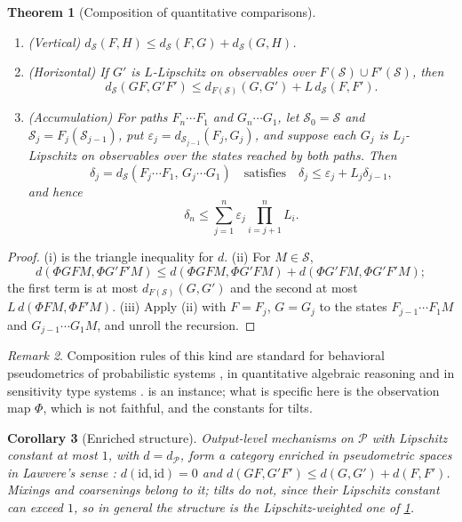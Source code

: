 \documentclass[11pt]{article}
\newtheorem{theorem}{Theorem}[section]
\newtheorem{corollary}[theorem]{Corollary}
\theoremstyle{definition}
\theoremstyle{remark}
\newtheorem{remark}[theorem]{Remark}
\newcommand{\cP}{\mathcal{P}}
\newcommand{\cS}{\mathcal{S}}
\begin{document}
\begin{theorem}[Composition of quantitative comparisons]\label{thm:composition}
\leavevmode
\begin{enumerate}[label=(\roman*)]
\item (Vertical) $d_\cS(F,H)\le d_\cS(F,G)+d_\cS(G,H)$.
\item (Horizontal) If $G'$ is $L$-Lipschitz on observables over $F(\cS)\cup F'(\cS)$, then
  \[
  d_\cS(GF,G'F')\le d_{F(\cS)}(G,G')+L\,d_\cS(F,F').
  \]
\item (Accumulation) For paths $F_n\cdots F_1$ and $G_n\cdots G_1$, let $\cS_0=\cS$ and
  $\cS_j=F_j(\cS_{j-1})$, put $\varepsilon_j=d_{\cS_{j-1}}(F_j,G_j)$, and suppose each $G_j$ is
  $L_j$-Lipschitz on observables over the states reached by both paths. Then
  \[
  \delta_j=d_\cS(F_j\cdots F_1,\,G_j\cdots G_1)\quad\text{satisfies}\quad
  \delta_j\le\varepsilon_j+L_j\delta_{j-1},
  \]
  and hence
  \[
  \delta_n\le\sum_{j=1}^n\varepsilon_j\prod_{i=j+1}^nL_i .
  \]
\end{enumerate}
\end{theorem}
\begin{proof}
(i) is the triangle inequality for $d$. (ii) For $M\in\cS$,
\[
d(\Phi GFM,\Phi G'F'M)\le d(\Phi GFM,\Phi G'FM)+d(\Phi G'FM,\Phi G'F'M);
\]
the first term is at most $d_{F(\cS)}(G,G')$ and the second at most $L\,d(\Phi FM,\Phi F'M)$. (iii) Apply (ii) with $F=F_j$, $G=G_j$ to the states $F_{j-1}\cdots F_1M$
and $G_{j-1}\cdots G_1M$, and unroll the recursion.
\end{proof}

\begin{remark}
Composition rules of this kind are standard for behavioral pseudometrics of probabilistic systems
\cite{Desharnais2004}, in quantitative algebraic reasoning \cite{MPP2016} and in sensitivity type
systems \cite{ReedPierce2010}.  is an instance; what is specific here is the
observation map $\Phi$, which is not faithful, and the constants for tilts.
\end{remark}

\begin{corollary}[Enriched structure]\label{cor:enriched}
Output-level mechanisms on $\cP$ with Lipschitz constant at most $1$, with $d=d_{\cP}$, form a
category enriched in pseudometric spaces in Lawvere's sense \cite{Lawvere1973}:
$d(\mathrm{id},\mathrm{id})=0$ and $d(GF,G'F')\le d(G,G')+d(F,F')$. Mixings and coarsenings belong to it; tilts do not, since their
Lipschitz constant can exceed $1$, so in general the structure is the Lipschitz-weighted one of
\cref{thm:composition}.
\end{corollary}
\end{document}
